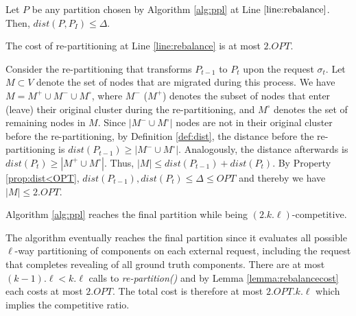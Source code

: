 \begin{property} \label{prop:dist<OPT}
	Let $P$ be any partition chosen by Algorithm \ref{alg:ppl} at Line $\ref{line:rebalance}$.
	Then, $dist(P,P_I) \leq \Delta$.
\end{property}

\begin{lemma}	\label{lemma:rebalancecost}
	The cost of re-partitioning at Line \ref{line:rebalance} is at most $2.OPT$.
\end{lemma}
\begin{IEEEproof}
	Consider the re-partitioning that transforms $P_{t-1}$ to $P_t$ upon the request $\sigma_t$.
	Let $M \subset V$ denote the set of nodes that are migrated during this process.
	We have $M = M^+ \cup M^- \cup M^\circ$,
	where $M^-$ ($M^+$) denotes the subset of nodes that
	enter (leave) their original cluster during the re-partitioning,
	and $M^\circ$ denotes the set of remaining nodes in $M$.
	Since $|M^- \cup M^\circ|$ nodes are not in their original cluster before the re-partitioning,
	by Definition \ref{def:dist},
	the distance before the re-partitioning is $dist(P_{t-1}) \geq | M^- \cup M^\circ |$.
	Analogously,
	 the distance afterwards is $dist(P_{t}) \geq | M^+ \cup M^\circ |$.
	Thus,
	$|M| \leq dist(P_{t-1}) + dist(P_{t})$.
	By Property \ref{prop:dist<OPT},
	$dist(P_{t-1}) , dist(P_{t}) \leq \Delta \leq OPT$
	and thereby we have	
	$|M| \leq 2.OPT$.
\end{IEEEproof}

\begin{theorem}	\label{thm:upperbound}
	Algorithm \ref{alg:ppl} reaches the final partition while being $(2.k.\ell)$-competitive.
\end{theorem}
\begin{IEEEproof}
	The algorithm eventually reaches the final partition since it
	 evaluates all possible $\ell$-way partitioning of components on each external request,
	including the request that completes revealing of all ground truth components.
	There are at most $(k-1).\ell < k.\ell $ calls to \emph{re-partition()} and by Lemma \ref{lemma:rebalancecost} each costs at most $2.OPT$.
	The total cost is therefore at most $2.OPT.k.\ell$ which implies the competitive ratio.
\end{IEEEproof}